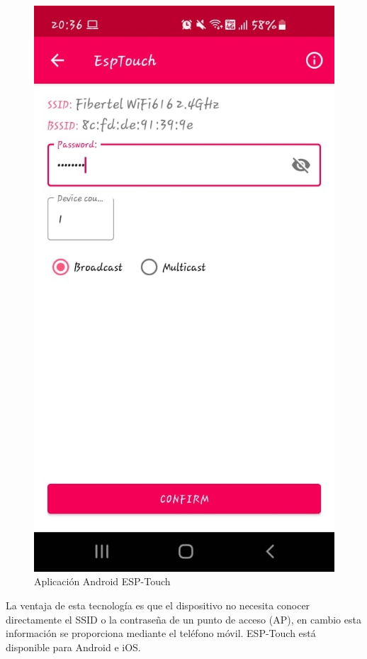 \begin{figure}[htpb]
	\centering
	\includegraphics[scale=.5]{./Figures/EspTouch.jpeg}
	\caption{Aplicación Android ESP-Touch}
	\label{fig:EspTouch}
\end{figure}

La ventaja de esta tecnología es que el dispositivo no necesita conocer directamente el SSID o la contraseña de un punto de acceso (AP), en cambio esta información se proporciona mediante el teléfono móvil. ESP-Touch está disponible para Android e iOS.

